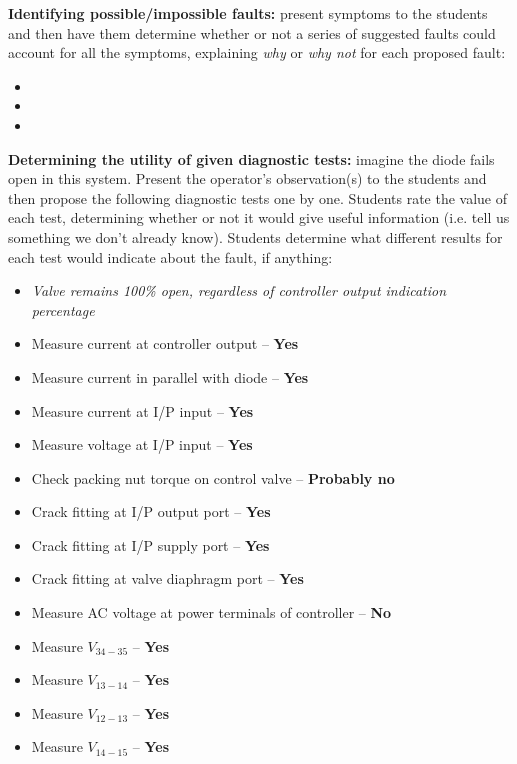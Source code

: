 \documentclass[12pt,a4paper]{article}
\begin{document}
\vskip 10pt


\noindent
{\bf Identifying possible/impossible faults:} present symptoms to the students and then have them determine whether or not a series of suggested faults could account for all the symptoms, explaining {\it why} or {\it why not} for each proposed fault:

\begin{itemize}
\item{} 
\item{} 
\item{} 
\end{itemize}


\vskip 10pt


\noindent
{\bf Determining the utility of given diagnostic tests:} imagine the diode fails open in this system.  Present the operator's observation(s) to the students and then propose the following diagnostic tests one by one.  Students rate the value of each test, determining whether or not it would give useful information (i.e. tell us something we don't already know).  Students determine what different results for each test would indicate about the fault, if anything:

\begin{itemize}
\item{} {\it Valve remains 100\% open, regardless of controller output indication percentage}
\item{} Measure current at controller output -- {\bf Yes}
\item{} Measure current in parallel with diode -- {\bf Yes}
\item{} Measure current at I/P input -- {\bf Yes}
\item{} Measure voltage at I/P input -- {\bf Yes}
\item{} Check packing nut torque on control valve -- {\bf Probably no}
\item{} Crack fitting at I/P output port -- {\bf Yes}
\item{} Crack fitting at I/P supply port -- {\bf Yes}
\item{} Crack fitting at valve diaphragm port -- {\bf Yes}
\item{} Measure AC voltage at power terminals of controller -- {\bf No}
\item{} Measure $V_{34-35}$ -- {\bf Yes}
\item{} Measure $V_{13-14}$ -- {\bf Yes}
\item{} Measure $V_{12-13}$ -- {\bf Yes}
\item{} Measure $V_{14-15}$ -- {\bf Yes}
\end{itemize}
\end{document}
